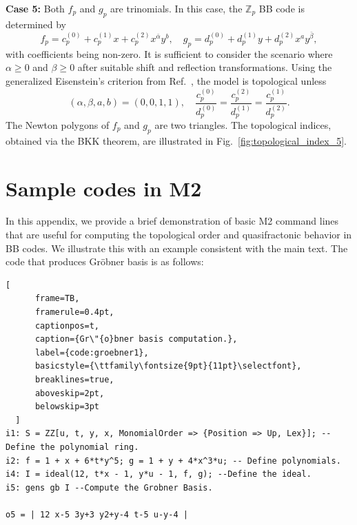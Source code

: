 \documentclass[aps,prb,english,superscriptaddress,twocolumn,tightenlines,showpacs,longbibliography,floatfix,amsfonts]{revtex4-2}
\begin{document}
\textbf{Case 5: } Both $f_p$ and $g_p$ are trinomials. In this case, the $\mathbb{Z}_p$ BB code is determined by
\begin{equation}
    f_p=c^{(0)}_p+c^{(1)}_px+c^{(2)}_px^{\bar{\alpha}}y^b,\quad g_p=d^{(0)}_p+d^{(1)}_py+d^{(2)}_px^ay^{\bar{\beta}},
\end{equation}
with coefficients being non-zero. It is sufficient to consider the scenario where $\alpha\geq 0$ and $\beta\geq 0$ after suitable shift and reflection transformations. Using the generalized Eisenstein’s criterion from Ref.~\cite{Chen2025}, the model is topological unless
\begin{equation}
    (\alpha,\beta,a,b)=(0,0,1,1),\quad \frac{c^{(0)}_p}{d^{(0)}_p}=\frac{c^{(2)}_p}{d^{(1)}_p}=\frac{c^{(1)}_p}{d^{(2)}_p}.
\end{equation}
The Newton polygons of $f_p$ and $g_p$ are two triangles. The topological indices, obtained via the BKK theorem, are illustrated in Fig.~\ref{fig:topological_index_5}.



\section{Sample codes in M2}
\label{app5}
In this appendix, we provide a brief demonstration of basic M2 command lines that are useful for computing the topological order and quasifractonic behavior in BB codes. We illustrate this with an example consistent with the main text. The code that produces Gr\"{o}bner basis is as follows:
\begin{lstlisting}[
      frame=TB,             
      framerule=0.4pt,
      captionpos=t,
      caption={Gr\"{o}bner basis computation.},
      label={code:groebner1},
      basicstyle={\ttfamily\fontsize{9pt}{11pt}\selectfont},
      breaklines=true,
      aboveskip=2pt,        
      belowskip=3pt
  ]
i1: S = ZZ[u, t, y, x, MonomialOrder => {Position => Up, Lex}]; --Define the polynomial ring.
i2: f = 1 + x + 6*t*y^5; g = 1 + y + 4*x^3*u; -- Define polynomials.
i4: I = ideal(12, t*x - 1, y*u - 1, f, g); --Define the ideal.
i5: gens gb I --Compute the Grobner Basis.

o5 = | 12 x-5 3y+3 y2+y-4 t-5 u-y-4 |
\end{lstlisting}
\end{document}
